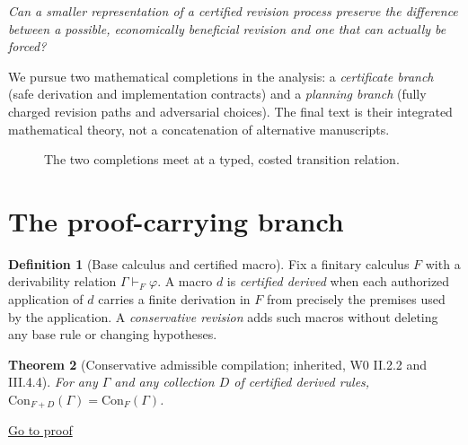 \documentclass[11pt,letterpaper]{article}
\newtheorem{theorem}{Theorem}[section]
\theoremstyle{definition}
\newtheorem{definition}[theorem]{Definition}
\theoremstyle{remark}
\newcommand{\backproof}[1]{\hfill\hyperlink{proof:#1}{\footnotesize Go to proof}}
\begin{document}
\emph{Can a smaller representation of a certified revision process preserve the difference between a possible, economically beneficial revision and one that can actually be forced?}

We pursue two mathematical completions in the analysis: a \emph{certificate branch} (safe derivation and implementation contracts) and a \emph{planning branch} (fully charged revision paths and adversarial choices). The final text is their integrated mathematical theory, not a concatenation of alternative manuscripts.

\begin{figure}[ht]
\centering
{}
\caption{The two completions meet at a typed, costed transition relation.}
\end{figure}

\section{The proof-carrying branch}
\begin{definition}[Base calculus and certified macro]
Fix a finitary calculus $F$ with a derivability relation $\Gamma\vdash_F\varphi$. A macro $d$ is \emph{certified derived} when each authorized application of $d$ carries a finite derivation in $F$ from precisely the premises used by the application. A \emph{conservative revision} adds such macros without deleting any base rule or changing hypotheses.
\end{definition}

\begin{theorem}[Conservative admissible compilation; inherited, W0 II.2.2 and III.4.4]\label{thm:cons}\hypertarget{stmt:cons}{}
For any $\Gamma$ and any collection $D$ of certified derived rules, $\mathrm{Con}_{F+D}(\Gamma)=\mathrm{Con}_F(\Gamma)$.
\end{theorem}\backproof{cons}
\end{document}
